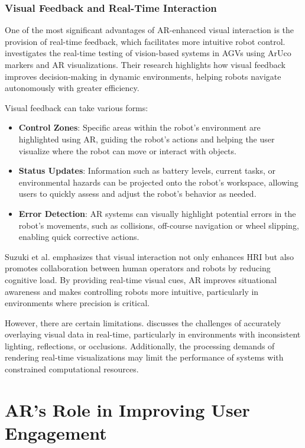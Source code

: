 \subsubsection{Visual Feedback and Real-Time Interaction}

One of the most significant advantages of AR-enhanced visual interaction is the provision of real-time feedback, which facilitates more intuitive robot control. \cite{Filus2023} investigates the real-time testing of vision-based systems in AGVs using ArUco markers and AR visualizations. Their research highlights how visual feedback improves decision-making in dynamic environments, helping robots navigate autonomously with greater efficiency.

Visual feedback can take various forms:
\begin{itemize}
    \item \textbf{Control Zones}: Specific areas within the robot's environment are highlighted using AR, guiding the robot's actions and helping the user visualize where the robot can move or interact with objects.
    \item \textbf{Status Updates}: Information such as battery levels, current tasks, or environmental hazards can be projected onto the robot’s workspace, allowing users to quickly assess and adjust the robot’s behavior as needed.
    \item \textbf{Error Detection}: AR systems can visually highlight potential errors in the robot's movements, such as collisions, off-course navigation or wheel slipping, enabling quick corrective actions.
\end{itemize}


Suzuki et al. \cite{Suzuki2022} emphasizes that visual interaction not only enhances HRI but also promotes collaboration between human operators and robots by reducing cognitive load. By providing real-time visual cues, AR improves situational awareness and makes controlling robots more intuitive, particularly in environments where precision is critical.

However, there are certain limitations. \cite{Daponte2020} discusses the challenges of accurately overlaying visual data in real-time, particularly in environments with inconsistent lighting, reflections, or occlusions. Additionally, the processing demands of rendering real-time visualizations may limit the performance of systems with constrained computational resources.

\section{AR's Role in Improving User Engagement}

